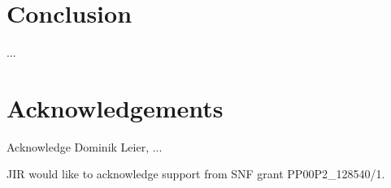 \documentclass[useAMS,usenatbib]{mn2e}
\begin{document}
\section{Conclusion}\label{sec:conclusion}
...


\section{Acknowledgements}\label{sec:acknowledgements}
Acknowledge Dominik Leier, ...

JIR would like to acknowledge support from SNF grant PP00P2\_128540/1.




\end{document}
